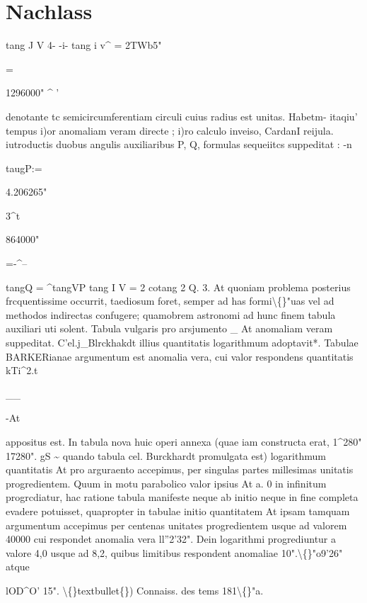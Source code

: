 \documentclass[10pt,a4paper]{article}
\begin{document}
\newpage
\section*{Nachlass}


tang J V 4- -i- tang i v\textasciicircum{} = 2TWb5"

=

1296000" \textasciicircum{} '

denotante tc semicircumferentiam circuli cuius radius est unitas. Habetm- itaqiu' tempus i)or anomaliam veram directe ; i)ro calculo inveiso, CardanI reijula. iutroductis duobus angulis auxiliaribus P, Q, formulas sequeiitcs suppeditat :
-n

taugP:=

4.206265"

3\textasciicircum{}t

864000"

=-\textasciicircum{}--

tangQ = \textasciicircum{}tangVP
tang I V = 2 cotang 2 Q.
3.
At quoniam problema posterius frcquentissime occurrit, taediosum foret,
semper ad has formi\textbackslash\{\}"uas vel ad methodos indirectas confugere; quamobrem
astronomi ad hunc finem tabula auxiliari uti solent.
Tabula vulgaris pro
arsjumento
\_ At
anomaliam veram suppeditat. C'el.j\_Blrckhakdt illius quantitatis logarithmum
adoptavit*. Tabulae BARKERianae argumentum est anomalia vera, cui valor
respondens quantitatis
kTi\textasciicircum{}2.t

\_\_

-At

appositus est. In tabula nova huic operi
annexa (quae iam constructa erat,
1\textasciicircum{}280"
17280". gS \textasciitilde{}
quando tabula cel. Burckhardt promulgata est) logarithmum quantitatis At
pro arguraento accepimus, per singulas partes millesimas unitatis progredientem.
Quum in motu parabolico valor ipsius At a. 0 in infinitum progrcdiatur, hac
ratione tabula manifeste neque ab initio neque in fine completa evadere potuisset, quapropter in tabulae initio quantitatem At ipsam tamquam argumentum accepimus per centenas unitates progredientem usque ad valorem
40000 cui respondet anomalia vera ll''2'32". Dein logarithmi progrediuntur
a valore 4,0 usque ad 8,2, quibus limitibus respondent anomaliae 10".\textbackslash\{\}"o9'26"
atque

lOD\textasciicircum{}O' 15".
\textbackslash\{\}textbullet\{\}) Connaiss. des tems 181\textbackslash\{\}"a.
\end{document}
